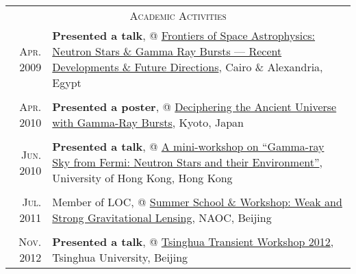 \documentclass[10pt]{article}
\begin{document}
\vspace{-3.5em}

\begin{longtable}{r|p{16.5cm}}
\multicolumn{2}{c}{\textsc{Academic Activities}}  \\
\textsc{Apr. 2009}   &   \textbf{Presented a talk}, @ \href{http://www.ns-grb.com/index0.html}{Frontiers of Space Astrophysics: Neutron Stars \& Gamma Ray Bursts --- Recent Developments \& Future Directions}, Cairo \& Alexandria, Egypt     \\
\multicolumn{2}{c}{} \\
\textsc{Apr. 2010}   &   \textbf{Presented a poster}, @ \href{http://www-tap.scphys.kyoto-u.ac.jp/GRB2010/}{Deciphering the Ancient Universe with Gamma-Ray Bursts}, Kyoto, Japan    \\
\multicolumn{2}{c}{} \\
\textsc{Jun. 2010}   &   \textbf{Presented a talk}, @ \href{http://www.physics.hku.hk/~astro/2010Astro/Index.htm}{A mini-workshop on ``Gamma-ray Sky from Fermi: Neutron Stars and their Environment''}, University of Hong Kong, Hong Kong   \\
\multicolumn{2}{c}{} \\
\textsc{Jul. 2011}   &   Member of LOC, @ \href{http://lss.bao.ac.cn/meeting/lens11/}{Summer School \& Workshop: Weak and Strong Gravitational Lensing}, NAOC, Beijing  \\
\multicolumn{2}{c}{} \\
\textsc{Nov. 2012}   &   \textbf{Presented a talk}, @ \href{http://www.thca.tsinghua.edu.cn/en/index.php/Workshop_programme}{Tsinghua Transient Workshop 2012}, Tsinghua University, Beijing   \\
\end{longtable}
\end{document}
